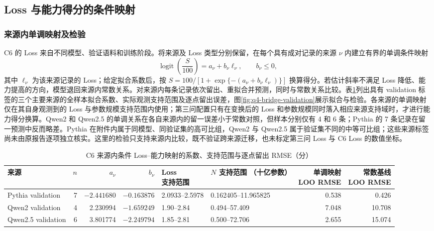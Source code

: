 \subsection{Loss 与能力得分的条件映射}

\subsubsection{来源内单调映射及检验}

C6 的 Loss 来自不同模型、验证语料和训练阶段。将来源及 Loss 类型分别保留，在每个具有成对记录的来源 $\nu$ 内建立有界的单调条件映射
\begin{equation}
 \operatorname{logit}\!\left(\frac{S}{100}\right)
 =a_{\nu}+b_{\nu}\ell_{\nu},\qquad b_{\nu}\leq0,
 \label{eq:q4-bridge}
\end{equation}
其中 $\ell_{\nu}$ 为该来源记录的 Loss；给定拟合系数后，按 $S=100/[1+\exp\{-(a_{\nu}+b_{\nu}\ell_{\nu})\}]$ 换算得分。若估计斜率不满足 Loss 降低、能力提高的方向，模型退回来源内常数关系。对来源内每条记录依次留出、重拟合并预测\cite{islr2021}，同时与常数关系比较。表\ref{tab:q4-bridge-validation}列出具有 validation 标签的三个主要来源的全样本拟合系数、实际观测支持范围及逐点留出误差，图\ref{fig:q4-bridge-validation}展示拟合与检验。各来源的单调映射仅在其自身观测到的 Loss 与参数规模支持范围内使用；第三问配置只有在变换后的 Loss 和参数规模同时落入相应来源支持域时，才进行能力得分换算。Qwen2 和 Qwen2.5\cite{qwen22024,qwen252024} 的单调关系在各自来源内的留一误差小于常数对照，但样本分别仅有 4 和 6 条；Pythia 的 7 条记录在留一预测中反而略差。Pythia 在附件内属于同模型、同验证集的高可比组，Qwen2 与 Qwen2.5 属于验证集不同的中等可比组；这些来源标签尚未由原报告逐项独立核实。这里的检验只支持来源内比较，既不验证跨来源迁移，也未标定第三问 Loss 与 C6 Loss 的数值坐标。

\begin{table}[htbp]
 \centering\footnotesize
 \setlength{\tabcolsep}{3pt}
 \caption{C6 来源内条件 Loss--能力映射的系数、支持范围与逐点留出 RMSE（分）}
 \label{tab:q4-bridge-validation}
 \begin{tabular}{@{}lrrrllrr@{}}
 \toprule
 来源 & $n$ & $a_{\nu}$ & $b_{\nu}$ & \makecell{Loss\\支持范围} & \makecell{$N$ 支持范围\\（十亿参数）} & \makecell{单调映射\\LOO RMSE} & \makecell{常数基线\\LOO RMSE}\\
 \midrule
 Pythia validation & 7 & $-2.441680$ & $-0.163876$ & 2.0933--2.5978 & 0.162405--11.965825 & 0.538 & 0.426\\
 Qwen2 validation & 4 & 2.230994 & $-1.659249$ & 1.90--2.84 & 0.494--57.409 & 7.048 & 10.708\\
 Qwen2.5 validation & 6 & 3.801774 & $-2.249794$ & 1.85--2.81 & 0.500--72.706 & 2.655 & 15.074\\
 \bottomrule
 \end{tabular}
\end{table}

